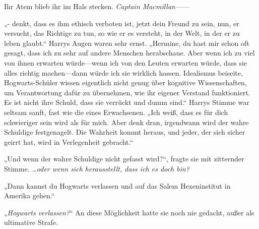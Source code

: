 Ihr Atem blieb ihr im Hals stecken. \emph{Captain Macmillan—}—

„- denkt, dass es ihm ethisch verboten ist, jetzt dein Freund zu sein, nun, er versucht, das Richtige zu tun, so wie er es versteht, in der Welt, in der er zu leben glaubt.“
Harrys Augen waren sehr ernst. „Hermine, du hast mir schon oft gesagt, dass ich zu sehr auf andere Menschen herabschaue. Aber wenn ich zu viel von ihnen erwarten würde—wenn ich von den Leuten erwarten würde, dass sie alles richtig machen—dann würde ich sie wirklich hassen. Idealismus beiseite, Hogwarts-Schüler wissen eigentlich nicht genug über kognitive Wissenschaften, um Verantwortung dafür zu übernehmen, wie ihr eigener Verstand funktioniert. Es ist nicht ihre Schuld, dass sie verrückt und dumm sind.“
Harrys Stimme war seltsam sanft, fast wie die eines Erwachsenen.
„Ich weiß, dass es für dich schwieriger sein wird als für mich. Aber denk dran, irgendwann wird der wahre Schuldige festgenagelt. Die Wahrheit kommt heraus, und jeder, der sich sicher geirrt hat, wird in Verlegenheit gebracht.“


„Und wenn der wahre Schuldige nicht gefasst wird?“, fragte sie mit zitternder Stimme. \emph{…oder wenn sich herausstellt, dass ich es doch bin?}

„Dann kannst du Hogwarts verlassen und auf das Salem Hexeninstitut in Amerika gehen.“

„\emph{Hogwarts verlassen?}“ An diese Möglichkeit hatte sie noch nie gedacht, außer als ultimative Strafe.

